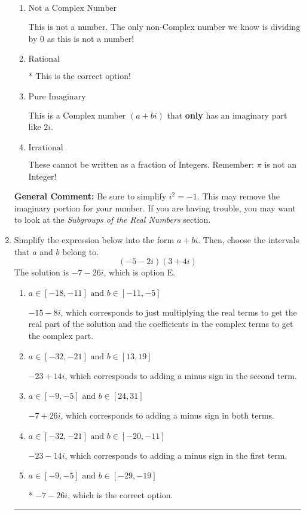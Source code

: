 \documentclass{extbook}[14pt]
\newcommand{\litem}[1]{\item #1

\rule{\textwidth}{0.4pt}}
\begin{document}
\begin{enumerate}
{\begin{enumerate}[label=\Alph*.]
This is a Complex number $(a+bi)$ that is not Real (has $i$ as part of the number).
\item \( \text{Not a Complex Number} \)

This is not a number. The only non-Complex number we know is dividing by 0 as this is not a number!
\item \( \text{Rational} \)

* This is the correct option!
\item \( \text{Pure Imaginary} \)

This is a Complex number $(a+bi)$ that \textbf{only} has an imaginary part like $2i$.
\item \( \text{Irrational} \)

These cannot be written as a fraction of Integers. Remember: $\pi$ is not an Integer!
\end{enumerate}

\textbf{General Comment:} Be sure to simplify $i^2 = -1$. This may remove the imaginary portion for your number. If you are having trouble, you may want to look at the \textit{Subgroups of the Real Numbers} section.
}
\litem{
Simplify the expression below into the form $a+bi$. Then, choose the intervals that $a$ and $b$ belong to.
\[ (-5 - 2 i)(3 + 4 i) \]The solution is \( -7 - 26 i \), which is option E.\begin{enumerate}[label=\Alph*.]
\item \( a \in [-18, -11] \text{ and } b \in [-11, -5] \)

 $-15 - 8 i$, which corresponds to just multiplying the real terms to get the real part of the solution and the coefficients in the complex terms to get the complex part.
\item \( a \in [-32, -21] \text{ and } b \in [13, 19] \)

 $-23 + 14 i$, which corresponds to adding a minus sign in the second term.
\item \( a \in [-9, -5] \text{ and } b \in [24, 31] \)

 $-7 + 26 i$, which corresponds to adding a minus sign in both terms.
\item \( a \in [-32, -21] \text{ and } b \in [-20, -11] \)

 $-23 - 14 i$, which corresponds to adding a minus sign in the first term.
\item \( a \in [-9, -5] \text{ and } b \in [-29, -19] \)

* $-7 - 26 i$, which is the correct option.
\end{enumerate}

}
\end{enumerate}
\end{document}
